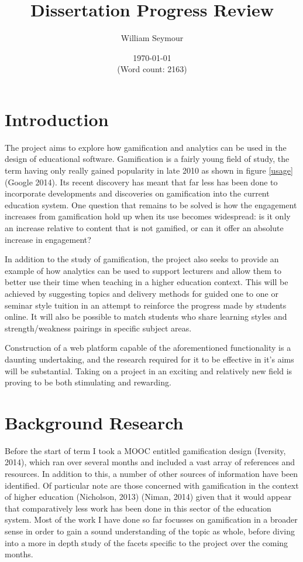 \documentclass[10pt,a4paper]{report}
\author{William Seymour}
\title{Dissertation Progress Review}
\date{\today \\ (Word count: 2163)}
\begin{document}
\maketitle

\section*{Introduction}
The project aims to explore how gamification and analytics can be used in the design of educational software. Gamification is a fairly young field of study, the term having only really gained popularity in late 2010 as shown in figure \ref{usage} (Google 2014). Its recent discovery has meant that far less has been done to incorporate developments and discoveries on gamification into the current education system. One question that remains to be solved is how the engagement increases from gamification hold up when its use becomes widespread: is it only an increase relative to content that is not gamified, or can it offer an absolute increase in engagement?

In addition to the study of gamification, the project also seeks to provide an example of how analytics can be used to support lecturers and allow them to better use their time when teaching in a higher education context. This will be achieved by suggesting topics and delivery methods for guided one to one or seminar style tuition in an attempt to reinforce the progress made by students online. It will also be possible to match students who share learning styles and strength/weakness pairings in specific subject areas.

Construction of a web platform capable of the aforementioned functionality is a daunting undertaking, and the research required for it to be effective in it's aims will be substantial. Taking on a project in an exciting and relatively new field is proving to be both stimulating and rewarding.

\section*{Background Research}
Before the start of term I took a MOOC entitled gamification design (Iversity, 2014), which ran over several months and included a vast array of references and resources. In addition to this, a number of other sources of information have been identified. Of particular note are those concerned with gamification in the context of higher education (Nicholson, 2013) (Niman, 2014) given that it would appear that comparatively less work has been done in this sector of the education system. Most of the work I have done so far focusses on gamification in a broader sense in order to gain a sound understanding of the topic as whole, before diving into a more in depth study of the facets specific to the project over the coming months.
\end{document}
